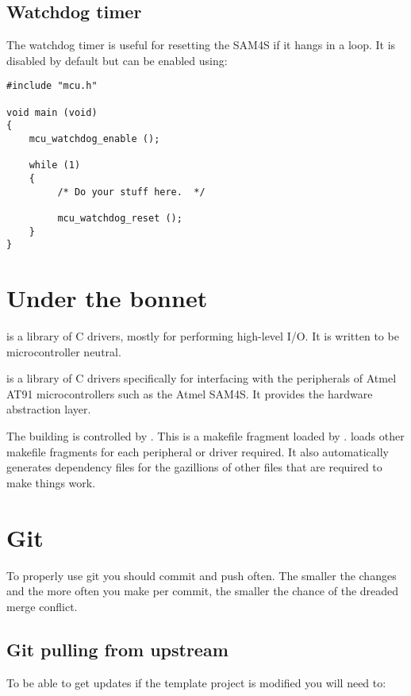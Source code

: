 \subsection{Watchdog timer}
\label{watchdog-timer}

The watchdog timer is useful for resetting the SAM4S if it hangs in a
loop.  It is disabled by default but can be enabled using:
%
\begin{verbatim}
#include "mcu.h"

void main (void)
{
    mcu_watchdog_enable ();
   
    while (1)
    {
         /* Do your stuff here.  */

         mcu_watchdog_reset ();
    }
}
\end{verbatim}

\section{Under the bonnet}
\label{under-the-bonnet}

 is a library of C drivers, mostly for performing high-level I/O.
It is written to be microcontroller neutral.

 is a library of C drivers specifically for interfacing
with the peripherals of Atmel AT91 microcontrollers such as the Atmel
SAM4S. It provides the hardware abstraction layer.

The building is controlled by . This is a
makefile fragment loaded by .
 loads other makefile fragments for each
peripheral or driver required. It also automatically generates
dependency files for the gazillions of other files that are required to
make things work.

\section{Git}
\label{git}

To properly use git you should commit and push often. The smaller the
changes and the more often you make per commit, the smaller the chance
of the dreaded merge conflict.

\subsection{Git pulling from upstream}
\label{git-pulling-from-upstream}

To be able to get updates if the template project is modified you will
need to:

